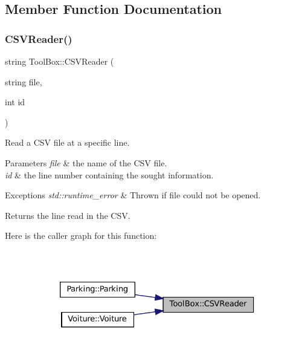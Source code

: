 \subsection{Member Function Documentation}
\mbox{\label{class_tool_box_a2dcc60d601f6460bc0c702db398e6279}} 
\subsubsection{\texorpdfstring{C\+S\+V\+Reader()}{CSVReader()}}
{\footnotesize\ttfamily string Tool\+Box\+::\+C\+S\+V\+Reader (\begin{DoxyParamCaption}\item[{string}]{file,  }\item[{int}]{id }\end{DoxyParamCaption})}



Read a C\+SV file at a specific line. 


\begin{DoxyParams}{Parameters}
{\em file} & the name of the C\+SV file. \\
\hline
{\em id} & the line number containing the sought information. \\
\hline
\end{DoxyParams}

\begin{DoxyExceptions}{Exceptions}
{\em std\+::runtime\+\_\+error} & Thrown if {\ttfamily file} could not be opened. \\
\hline
\end{DoxyExceptions}
\begin{DoxyReturn}{Returns}
the line read in the C\+SV. 
\end{DoxyReturn}
Here is the caller graph for this function\+:
\nopagebreak
\begin{figure}[H]
\begin{center}
\leavevmode
\includegraphics[width=326pt]{class_tool_box_a2dcc60d601f6460bc0c702db398e6279_icgraph}
\end{center}
\end{figure}
\mbox{\label{class_tool_box_a367d73930064f727b8ea349c64511535}} 
